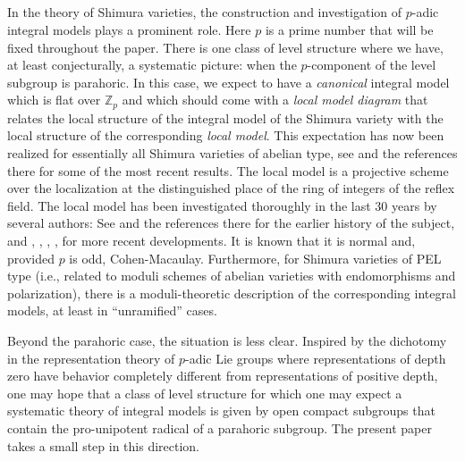 \documentclass[reqno, 10pt]{amsart}
\newcommand{\BZ}{\ensuremath{\mathbb {Z}}\xspace}
\theoremstyle{definition}
\numberwithin{equation}{subsection}
\numberwithin{subsubsection}{subsection}
\begin{document}
\subsection{}
In the theory of Shimura varieties, the construction and investigation of $p$-adic integral models plays a prominent role. Here $p$ is a prime number that will be fixed throughout the paper. There is one class of level structure where we have, at least conjecturally, a systematic picture: when the $p$-component of the level subgroup is parahoric. In this case, we expect to have a \emph{canonical} integral model \cite{PRg} which is flat over $\BZ_p$ and which should come with  a \emph{local model diagram} that relates the local structure of the integral model of the Shimura variety with the local structure of the corresponding \emph{local model}. This expectation has now been realized for 
essentially all Shimura varieties of abelian type, see \cite{KPZ} and the references there for some of the most recent results. The local model is a projective scheme over the localization at the distinguished place of the ring of integers of the reflex field. The local model has been investigated thoroughly in the last 30 years by several authors: See \cite{PRS} and the references there for the earlier history of the subject, and \cite{PZ},   \cite{SWberkeley}, \cite{HRi}, \cite{AGLR}, for more recent developments. It is known that it is normal and, provided $p$ is odd, Cohen-Macaulay. Furthermore, for Shimura varieties of PEL type (i.e., related to moduli schemes of abelian varieties with endomorphisms and polarization), there is a moduli-theoretic description of the corresponding integral models, at least in ``unramified'' cases.

Beyond the parahoric case, the situation is less clear. Inspired by the dichotomy in the representation theory of $p$-adic Lie groups where representations of depth zero have behavior completely different from representations of positive depth, one may hope that a class of level structure for which one may expect a systematic theory of integral models is given by open compact subgroups that contain the pro-unipotent radical of a parahoric subgroup. The present paper takes a small step in this direction.
\end{document}
